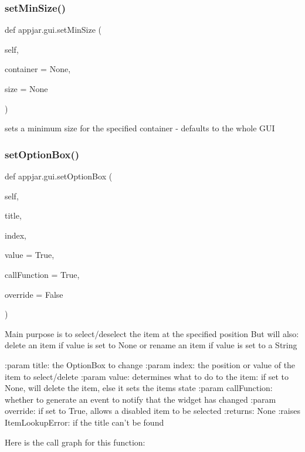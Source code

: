 \begin{DoxyVerb}
\subsubsection{\texorpdfstring{set\+Min\+Size()}{setMinSize()}}
{\footnotesize\ttfamily def appjar.\+gui.\+set\+Min\+Size (\begin{DoxyParamCaption}\item[{}]{self,  }\item[{}]{container = {\ttfamily None},  }\item[{}]{size = {\ttfamily None} }\end{DoxyParamCaption})}

\begin{DoxyVerb}sets a minimum size for the specified container - defaults to the whole GUI \end{DoxyVerb}
 \mbox{\label{classappjar_1_1gui_a1265f35528c0da179bf0ef8568fdf463}} 
\subsubsection{\texorpdfstring{set\+Option\+Box()}{setOptionBox()}}
{\footnotesize\ttfamily def appjar.\+gui.\+set\+Option\+Box (\begin{DoxyParamCaption}\item[{}]{self,  }\item[{}]{title,  }\item[{}]{index,  }\item[{}]{value = {\ttfamily True},  }\item[{}]{call\+Function = {\ttfamily True},  }\item[{}]{override = {\ttfamily False} }\end{DoxyParamCaption})}

\begin{DoxyVerb}Main purpose is to select/deselect the item at the specified position
But will also: delete an item if value is set to None or rename an item if value is set to a String

:param title: the OptionBox to change
:param index: the position or value of the item to select/delete
:param value: determines what to do to the item: if set to None, will delete the item, else it sets the items state
:param callFunction: whether to generate an event to notify that the widget has changed
:param override: if set to True, allows a disabled item to be selected
:returns: None
:raises ItemLookupError: if the title can't be found
\end{DoxyVerb}
 Here is the call graph for this function\+:
\mbox{\label{classappjar_1_1gui_a986ce814d62f922393612466c04a7236}} 

\end{DoxyVerb}
